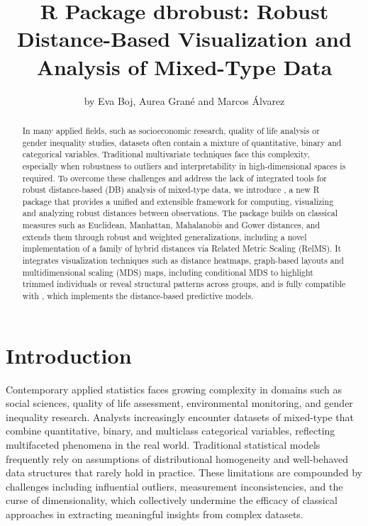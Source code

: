\title{R Package dbrobust: Robust Distance-Based Visualization and Analysis of Mixed-Type Data}
\author{by Eva Boj, Aurea Grané and Marcos \'Alvarez}

\maketitle

\begin{abstract}
In many applied fields, such as socioeconomic research, quality of life analysis or gender inequality studies, datasets often contain a mixture of quantitative, binary and categorical variables. Traditional multivariate techniques face this complexity, especially when robustness to outliers and interpretability in high-dimensional spaces is required. To overcome these challenges and address the lack of integrated tools for robust distance-based (DB) analysis of mixed-type data, we introduce , a new R package that provides a unified and extensible framework for computing, visualizing and analyzing robust distances between observations. The package builds on classical measures such as Euclidean, Manhattan, Mahalanobis and Gower distances, and extends them through robust and weighted generalizations, including a novel implementation of a family of hybrid distances via Related Metric Scaling (RelMS). It integrates visualization techniques such as distance heatmaps, graph-based layouts and multidimensional scaling (MDS) maps, including conditional MDS to highlight trimmed individuals or reveal structural patterns across groups, and is fully compatible with , which implements the distance-based predictive models.
\end{abstract}

\section{Introduction}
\label{sec.introduction}

Contemporary applied statistics faces growing complexity in domains such as social sciences, quality of life assessment, environmental monitoring, and gender inequality research. Analysts increasingly encounter datasets of mixed-type that combine quantitative, binary, and multiclass categorical variables, reflecting multifaceted phenomena in the real world. Traditional statistical models frequently rely on assumptions of distributional homogeneity and well-behaved data structures that rarely hold in practice. These limitations are compounded by challenges including influential outliers, measurement inconsistencies, and the curse of dimensionality, which collectively undermine the efficacy of classical approaches in extracting meaningful insights from complex datasets.


